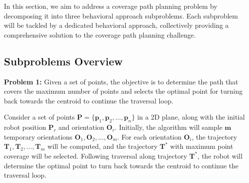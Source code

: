 


\theoremstyle{plain}


In this section, we aim to address a coverage path planning problem by decomposing it into three behavioral approach subproblems. Each subproblem will be tackled by a dedicated behavioral approach, collectively providing a comprehensive solution to the coverage path planning challenge.

\subsection*{Subproblems Overview}

\textbf{Problem 1:} Given a set of points, the objective is to determine the path that covers the maximum number of points and selects the optimal point for turning back towards the centroid to continue the traversal loop.

\vspace*{6mm}  

Consider a set of points $\mathbf{P} = \{ \mathbf{p}_1, \mathbf{p}_2, \ldots, \mathbf{p}_n \}$ in a 2D plane, along with the initial robot position $\mathbf{P}_r$ and orientation $\mathbf{O}_r$. Initially, the algorithm will sample $\mathbf{m}$ temporary orientations $\mathbf{O}_1, \mathbf{O}_2, \ldots, \mathbf{O}_m$. For each orientation $\mathbf{O}_i$, the trajectory $\mathbf{T}_1, \mathbf{T}_2, \ldots, \mathbf{T}_m$ will be computed, and the trajectory $\mathbf{T}^*$ with maximum point coverage will be selected. Following traversal along trajectory $\mathbf{T}^*$, the robot will determine the optimal point to turn back towards the centroid to continue the traversal loop.

